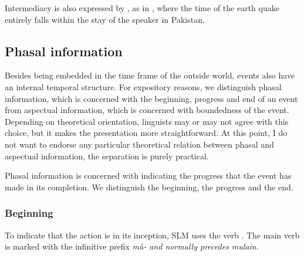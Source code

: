 Intermediacy is also expressed by  , as in , where the time of the  earth quake entirely falls within the stay of the speaker in Pakistan.



%

%




\subsection{Phasal information}\label{sec:func:Phasalinformation}
Besides being embedded in the time frame of the outside world, events also have an internal temporal structure. For expository reasons, we distinguish phasal information, which is concerned with the beginning, progress and end of an event from aspectual information, which is concerned with boundedness of the event. Depending on theoretical orientation, linguists may or may not agree with this choice, but it makes the presentation more straightforward. At this point, I do not want to endorse any particular theoretical relation between phasal and aspectual information, the separation is purely   practical.

Phasal information is concerned with indicating the progress that the event has made in its completion. We distinguish the beginning, the progress and the end.

\subsubsection{Beginning}
To indicate that the action is in its inception, SLM uses the verb . The main verb is marked with the infinitive prefix \em mà- \em and normally precedes \em mulain\em.

